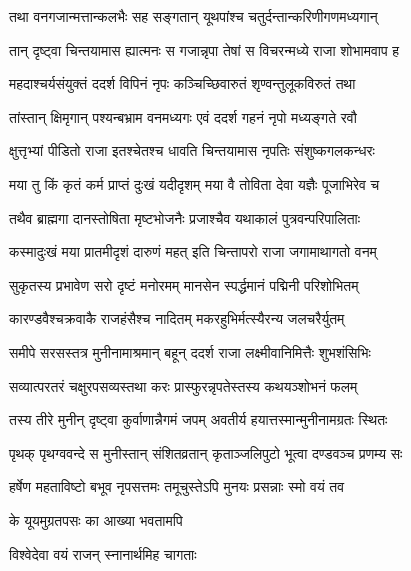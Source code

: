 \twolineshloka
{तथा वनगजान्मत्तान्कलभैः सह सङ्गतान्}
{यूथपांश्च चतुर्दन्तान्करिणीगणमध्यगान्} %

\twolineshloka
{तान् दृष्ट्वा चिन्तयामास ह्यात्मनः स गजान्नृपा}
{तेषां स विचरन्मध्ये राजा शोभामवाप ह} %

\twolineshloka
{महदाश्चर्यसंयुक्तं ददर्श विपिनं नृपः}
{कञ्चिच्छिवारुतं शृण्वन्तुलूकविरुतं तथा} %

\twolineshloka
{तांस्तान् क्षिमृगान् पश्यन्बभ्राम वनमध्यगः}
{एवं ददर्श गहनं नृपो मध्यङ्गते रवौ} %

\twolineshloka
{क्षुत्तृभ्यां पीडितो राजा इतश्चेतश्च धावति}
{चिन्तयामास नृपतिः संशुष्कगलकन्धरः} %

\twolineshloka
{मया तु किं कृतं कर्म प्राप्तं दुःखं यदीदृशम्}
{मया वै तोविता देवा यज्ञैः पूजाभिरेव च} %

\twolineshloka
{तथैव ब्राह्मगा दानस्तोषिता मृष्टभोजनैः}
{प्रजाश्चैव यथाकालं पुत्रवन्परिपालिताः} %

\twolineshloka
{कस्मादुःखं मया प्रातमीदृशं दारुणं महत्}
{इति चिन्तापरो राजा जगामाथागतो वनम्} %

\twolineshloka
{सुकृतस्य प्रभावेण सरो दृष्टं मनोरमम्}
{मानसेन स्पर्द्धमानं पद्मिनी परिशोभितम्} %

\twolineshloka
{कारण्डवैश्चक्रवाकै राजहंसैश्च नादितम्}
{मकरहुभिर्मत्स्यैरन्य जलचरैर्युतम्} %

\twolineshloka
{समीपे सरसस्तत्र मुनीनामाश्रमान् बहून्}
{ददर्श राजा लक्ष्मीवानिमित्तैः शुभशंसिभिः} %

\twolineshloka
{सव्यात्परतरं चक्षुरपसव्यस्तथा करः}
{प्रास्फुरन्नृपतेस्तस्य कथयञ्शोभनं फलम्} %

\twolineshloka
{तस्य तीरे मुनीन् दृष्ट्वा कुर्वाणान्नैगमं जपम्}
{अवतीर्य हयात्तस्मान्मुनीनामग्रतः स्थितः} %

\twolineshloka
{पृथक् पृथग्ववन्दे स मुनीस्तान् संशितव्रतान्}
{कृताञ्जलिपुटो भूत्वा दण्डवञ्च प्रणम्य सः} %

\twolineshloka
{हर्षेण महताविष्टो बभूव नृपसत्तमः}
{तमूचुस्तेऽपि मुनयः प्रसन्नाः स्मो वयं तव} %



\onelineshloka
{के यूयमुग्रतपसः का आख्या भवतामपि} %



\onelineshloka
{विश्वेदेवा वयं राजन् स्नानार्थमिह चागताः} %

